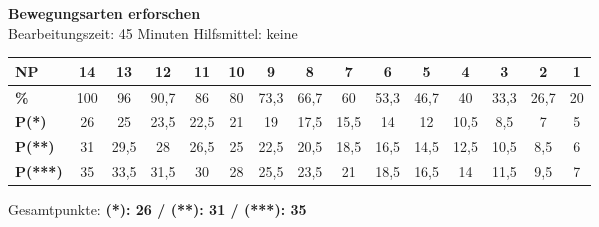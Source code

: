 \documentclass[11pt,a4paper]{article}
\begin{document}
\begin{center}
\Large\textbf{Bewegungsarten erforschen}\\[3pt]
\small Bearbeitungszeit: 45 Minuten \hfill Hilfsmittel: keine
\end{center}

\begin{center}
\tiny
\setlength{\tabcolsep}{2pt}
\begin{tabular}{|l|c|c|c|c|c|c|c|c|c|c|c|c|c|c|}
\hline
\textbf{NP} & 14 & 13 & 12 & 11 & 10 & 9 & 8 & 7 & 6 & 5 & 4 & 3 & 2 & 1 \\
\hline
\textbf{\%} & 100 & 96 & 90,7 & 86 & 80 & 73,3 & 66,7 & 60 & 53,3 & 46,7 & 40 & 33,3 & 26,7 & 20 \\
\hline
\textbf{P(*)} & 26 & 25 & 23,5 & 22,5 & 21 & 19 & 17,5 & 15,5 & 14 & 12 & 10,5 & 8,5 & 7 & 5 \\
\hline
\textbf{P(**)} & 31 & 29,5 & 28 & 26,5 & 25 & 22,5 & 20,5 & 18,5 & 16,5 & 14,5 & 12,5 & 10,5 & 8,5 & 6 \\
\hline
\textbf{P(***)} & 35 & 33,5 & 31,5 & 30 & 28 & 25,5 & 23,5 & 21 & 18,5 & 16,5 & 14 & 11,5 & 9,5 & 7 \\
\hline
\end{tabular}
\end{center}

\begin{center}
\small Gesamtpunkte: \textbf{(*): 26 / (**): 31 / (***): 35}
\end{center}

\begin{center}
\small
{}
\end{center}

\vspace{3mm}
\end{document}
